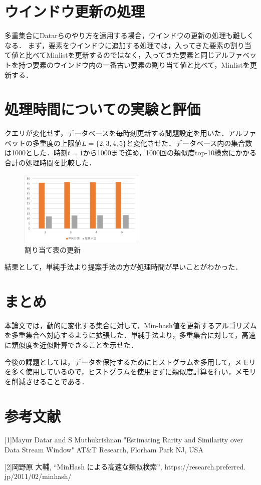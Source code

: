 \documentclass[a4j,twocolumn,dvipdfmx,autodetect-engine]{jsarticle}
\begin{document}
\section{ウインドウ更新の処理}
多重集合にDatarらのやり方を適用する場合，ウインドウの更新の処理も難しくなる．
まず，要素をウインドウに追加する処理では，入ってきた要素の割り当て値と比べてMinlistを更新するのではなく，入ってきた要素と同じアルファベットを持つ要素のウインドウ内の一番古い要素の割り当て値と比べて，Minlistを更新する．

\section{処理時間についての実験と評価}
クエリが変化せず，データベースを毎時刻更新する問題設定を用いた．アルファベットの多重度の上限値$L=\{2,3,4,5\}$と変化させた．データベース内の集合数は1000とした．時刻$t=1$から1000まで進め，1000回の類似度top-10検索にかかる合計の処理時間を比較した．
\begin{figure}[H]
  \centering
  \includegraphics[width=6cm]{hikaku.png}
  \caption{割り当て表の更新}
\end{figure}

結果として，単純手法より提案手法の方が処理時間が早いことがわかった．

\section{まとめ}
本論文では，動的に変化する集合に対して，Min-hash値を更新するアルゴリズムを多重集合へ対応するように拡張した．単純手法より，多重集合に対して，高速に類似度を近似計算できることを示せた．

今後の課題としては，データを保持するためにヒストグラムを多用して，メモリを多く使用しているので，ヒストグラムを使用せずに類似度計算を行い，メモリを削減させることである．

\section{参考文献}
[1]Mayur Datar and S Muthukrishnan "Estimating Rarity and Similarity over Data Stream Window" AT\&T Research, Florham Park NJ, USA

[2]岡野原 大輔, “MinHash による高速な類似検索”, https://research.preferred. jp/2011/02/minhash/
\end{document}
